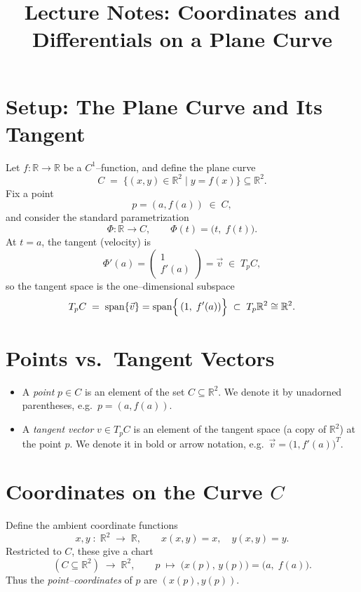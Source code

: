\documentclass[12pt]{article}
\title{Lecture Notes: Coordinates and Differentials on a Plane Curve}
\author{}
\date{}
\begin{document}
	\maketitle
	
	\section{Setup: The Plane Curve and Its Tangent}
	
	Let \(f\colon\mathbb{R}\to\mathbb{R}\) be a \(C^1\)–function, and define the plane curve
	\[
	C \;=\;\bigl\{(x,y)\in\mathbb{R}^2 \mid y=f(x)\bigr\}\subseteq\mathbb{R}^2.
	\]
	Fix a point
	\[
	p=(a,f(a))\;\in\;C,
	\]
	and consider the standard parametrization
	\[
	\Phi\colon \mathbb{R}\longrightarrow C,
	\qquad
	\Phi(t) = \bigl(t,\;f(t)\bigr).
	\]
	At \(t=a\), the tangent (velocity) is
	\[
	\Phi'(a)
	=\begin{pmatrix}
		1\\
		f'(a)
	\end{pmatrix}
	=\vec v
	\;\in\;T_pC,
	\]
	so the tangent space is the one–dimensional subspace
	\[
	T_pC \;=\;\mathrm{span}\{\vec v\}
	=\mathrm{span}\Bigl\{\,(1,\;f'(a))\Bigr\}
	\;\subset\;T_p\mathbb{R}^2\cong\mathbb{R}^2.
	\]
	
	\section{Points vs.\ Tangent Vectors}
	
	\begin{itemize}
		\item A \emph{point} \(p\in C\) is an element of the set \(C\subseteq\mathbb{R}^2\).
		We denote it by unadorned parentheses, e.g.\ \(p=(a,f(a))\).
		\item A \emph{tangent vector} \(v\in T_pC\) is an element of the tangent space
		(a copy of \(\mathbb{R}^2\)) at the point \(p\).  We denote it in bold or arrow notation,
		e.g.\ \(\vec v=\bigl(1,f'(a)\bigr)^T\).
	\end{itemize}
	
	\section{Coordinates on the Curve \(C\)}
	
	Define the ambient coordinate functions
	\[
	x,y\;\colon\;\mathbb{R}^2\;\longrightarrow\;\mathbb{R},
	\qquad
	x(x,y)=x,
	\quad
	y(x,y)=y.
	\]
	Restricted to \(C\), these give a chart
	\[
	(C\subseteq\mathbb{R}^2)\;\longrightarrow\;\mathbb{R}^2,
	\qquad
	p\;\mapsto\;\bigl(x(p),\,y(p)\bigr)
	=\bigl(a,\;f(a)\bigr).
	\]
	Thus the \emph{point–coordinates} of \(p\) are \((x(p),y(p))\).
	
\end{document}

